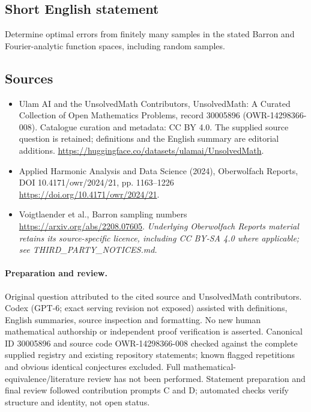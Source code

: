 \documentclass[11pt]{article}
\begin{document}
\subsection{Short English statement}
Determine optimal errors from finitely many samples in the stated Barron and Fourier-analytic function spaces, including random samples.
\subsection{Sources}
\begin{itemize}
\item[\hypertarget{source:30005896:1}{S1}] Ulam AI and the UnsolvedMath Contributors, UnsolvedMath: A Curated Collection of Open Mathematics Problems, record 30005896 (OWR-14298366-008). Catalogue curation and metadata: CC BY 4.0. The supplied source question is retained; definitions and the English summary are editorial additions.
\url{https://huggingface.co/datasets/ulamai/UnsolvedMath}.
\item[\hypertarget{source:30005896:2}{S2}] Applied Harmonic Analysis and Data Science (2024), Oberwolfach Reports, DOI 10.4171/owr/2024/21, pp. 1163--1226
\url{https://doi.org/10.4171/owr/2024/21}.
\item[\hypertarget{source:30005896:3}{S3}] Voigtlaender et al., Barron sampling numbers
\url{https://arxiv.org/abs/2208.07605}.
\textit{Underlying Oberwolfach Reports material retains its source-specific licence, including CC BY-SA 4.0 where applicable; see THIRD\_PARTY\_NOTICES.md.}
\end{itemize}
\paragraph{Preparation and review.}
Original question attributed to the cited source and UnsolvedMath contributors. Codex (GPT-6; exact serving revision not exposed) assisted with definitions, English summaries, source inspection and formatting. No new human mathematical authorship or independent proof verification is asserted. Canonical ID 30005896 and source code OWR-14298366-008 checked against the complete supplied registry and existing repository statements; known flagged repetitions and obvious identical conjectures excluded. Full mathematical-equivalence/literature review has not been performed. Statement preparation and final review followed contribution prompts C and D; automated checks verify structure and identity, not open status.
\label{end:30005896}
\end{document}
